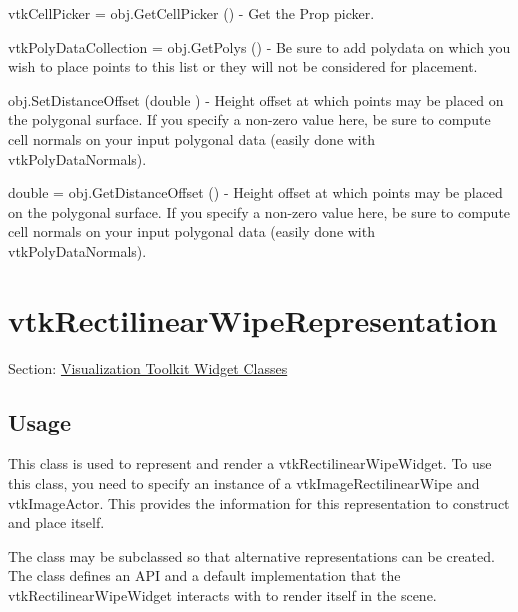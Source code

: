 \begin{DoxyItemize}
\item {\ttfamily vtk\-Cell\-Picker = obj.\-Get\-Cell\-Picker ()} -\/ Get the Prop picker.  
\item {\ttfamily vtk\-Poly\-Data\-Collection = obj.\-Get\-Polys ()} -\/ Be sure to add polydata on which you wish to place points to this list or they will not be considered for placement.  
\item {\ttfamily obj.\-Set\-Distance\-Offset (double )} -\/ Height offset at which points may be placed on the polygonal surface. If you specify a non-\/zero value here, be sure to compute cell normals on your input polygonal data (easily done with vtk\-Poly\-Data\-Normals).  
\item {\ttfamily double = obj.\-Get\-Distance\-Offset ()} -\/ Height offset at which points may be placed on the polygonal surface. If you specify a non-\/zero value here, be sure to compute cell normals on your input polygonal data (easily done with vtk\-Poly\-Data\-Normals).  
\end{DoxyItemize}\hypertarget{vtkwidgets_vtkrectilinearwiperepresentation}{}\section{vtk\-Rectilinear\-Wipe\-Representation}\label{vtkwidgets_vtkrectilinearwiperepresentation}
Section\-: \hyperlink{sec_vtkwidgets}{Visualization Toolkit Widget Classes} \hypertarget{vtkwidgets_vtkxyplotwidget_Usage}{}\subsection{Usage}\label{vtkwidgets_vtkxyplotwidget_Usage}
This class is used to represent and render a vtk\-Rectilinear\-Wipe\-Widget. To use this class, you need to specify an instance of a vtk\-Image\-Rectilinear\-Wipe and vtk\-Image\-Actor. This provides the information for this representation to construct and place itself.

The class may be subclassed so that alternative representations can be created. The class defines an A\-P\-I and a default implementation that the vtk\-Rectilinear\-Wipe\-Widget interacts with to render itself in the scene.

